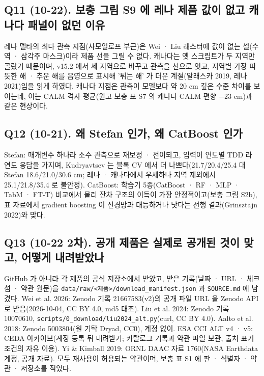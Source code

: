 \documentclass[10pt,a4paper]{article}
\begin{document}
\subsection*{Q11 (10-22). 보충 그림 S9 에 레나 제품 값이 없고 캐나다 패널이 없던 이유}
레나 델타의 최다 관측 지점(사모일로프 부근)은 Wei · Liu 래스터에 값이 없는 셀(수역 · 삼각주 마스크)이라 제품 선을 그릴 수 없다. 캐나다는 옛 스크립트가 두 지역만 골랐기 때문이며, v15.2 에서 세 지역으로 바꾸고 관측을 선으로 잇고, 지역별 가장 따뜻한 해 · 추운 해를 음영으로 표시해 '튀는 해' 가 더운 계절(알래스카 2019, 레나 2021)임을 읽게 하였다. 캐나다 지점은 관측이 모델보다 약 20 cm 깊은 수준 차이를 보이는데, 이는 CALM 격자 평균(원고 보충 표 S7 의 캐나다 CALM 편향 $-23$ cm)과 같은 현상이다.

\subsection*{Q12 (10-21). 왜 Stefan 인가, 왜 CatBoost 인가}
Stefan: 매개변수 하나라 소수 관측으로 재보정 · 전이되고, 입력이 연도별 TDD 라 연도 응답을 가지며, Kudryavtsev 는 블록 CV 에서 더 나쁘다(21.7/20.4/25.4 대 Stefan 18.6/21.0/30.6 cm; 레나 · 캐나다에서 우세하나 지역 제외에서 25.1/21.8/35.4 로 불안정). CatBoost: 학습기 5종(CatBoost · RF · MLP · TabM · FT-T) 비교에서 물리 잔차 구조의 이득이 가장 안정적이고(보충 그림 S2b), 표 자료에서 gradient boosting 이 신경망과 대등하거나 낫다는 선행 결과(Grinsztajn 2022)와 맞다.

\subsection*{Q13 (10-22 2차). 공개 제품은 실제로 공개된 것이 맞고, 어떻게 내려받았나}
GitHub 가 아니라 각 제품의 공식 저장소에서 받았고, 받은 기록(날짜 · URL · 체크섬 · 약관 원문)을 \texttt{data/raw/<제품>/download\_manifest.json} 과 \texttt{SOURCE.md} 에 남겼다. Wei et al. 2026: Zenodo 기록 21667583(v2)의 공개 파일 URL 을 Zenodo API 로 받음(2026-10-04, CC BY 4.0, md5 대조). Liu et al. 2024: Zenodo 기록 10070610, \texttt{scripts/0\_download/liu2024\_alt.py}(curl, CC BY 4.0). Aalto et al. 2018: Zenodo 5003804(원 기탁 Dryad, CC0), 계정 없이. ESA CCI ALT v4 · v5: CEDA 아카이브(계정 등록 뒤 내려받기; 카탈로그 기록과 약관 파일 보관, 출처 표기 조건의 자유 이용). Yi \& Kimball 2019: ORNL DAAC 자료 1760(NASA Earthdata 계정, 공개 자료). 모두 재사용이 허용되는 약관이며, 보충 표 S1 에 판 · 식별자 · 약관 · 저장소를 적었다.
\end{document}
